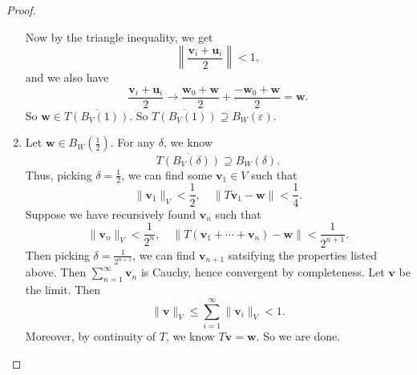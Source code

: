 \documentclass[a4paper]{article}
\begin{document}
\begin{proof}
\begin{enumerate}
      Now by the triangle inequality, we get
      \[
        \left\|\frac{\mathbf{v}_i + \mathbf{u}_i}{2}\right\| < 1,
      \]
      and we also have
      \[
        \frac{\mathbf{v}_i + \mathbf{u}_i}{2} \to \frac{\mathbf{w}_0 + \mathbf{w}}{2} + \frac{-\mathbf{w}_0 + \mathbf{w}}{2} = \mathbf{w}.
      \]
      So $\mathbf{w}\in \overline{T(B_V(1))}$. So $\overline{T(B_V(1))} \supseteq B_W(\varepsilon)$.
    \item Let $\mathbf{w} \in B_W(\frac{1}{2})$. For any $\delta$, we know
      \[
        \overline{T(B_V(\delta))} \supseteq B_W(\delta).
      \]
      Thus, picking $\delta = \frac{1}{2}$, we can find some $\mathbf{v}_1 \in V$ such that
      \[
        \|\mathbf{v}_1\|_V < \frac{1}{2},\quad \|T \mathbf{v}_1 - \mathbf{w}\| < \frac{1}{4}.
      \]
      Suppose we have recursively found $\mathbf{v}_n$ such that
      \[
        \|\mathbf{v}_n\|_V < \frac{1}{2^n},\quad \|T (\mathbf{v}_1 + \cdots + \mathbf{v}_n) - \mathbf{w}\| < \frac{1}{2^{n + 1}}.
      \]
      Then picking $\delta = \frac{1}{2^{n + 1}}$, we can find $\mathbf{v}_{n + 1}$ satsifying the properties listed above. Then $\sum_{n = 1}^\infty \mathbf{v}_n$ is Cauchy, hence convergent by completeness. Let $\mathbf{v}$ be the limit. Then
      \[
        \|\mathbf{v}\|_V \leq \sum_{i = 1}^\infty \|\mathbf{v}_i\|_V < 1.
      \]
      Moreover, by continuity of $T$, we know $T\mathbf{v} = \mathbf{w}$. So we are done.\qedhere
%
%
%

\end{enumerate}
\end{proof}
\end{document}
